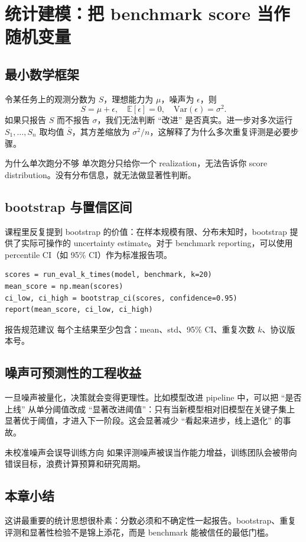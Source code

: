 \section{统计建模：把 benchmark score 当作随机变量}

\subsection{最小数学框架}
令某任务上的观测分数为 $S$，理想能力为 $\mu$，噪声为 $\epsilon$，则
$$
S = \mu + \epsilon,\quad \mathbb{E}[\epsilon]=0,\quad \mathrm{Var}(\epsilon)=\sigma^2.
$$
如果只报告 $S$ 而不报告 $\sigma$，我们无法判断 ``改进'' 是否真实。进一步对多次运行 $S_1,\dots,S_n$ 取均值 $\bar{S}$，其方差缩放为 $\sigma^2/n$，这解释了为什么多次重复评测是必要步骤。

\begin{knowledgebox}{为什么单次跑分不够}
单次跑分只给你一个 realization，无法告诉你 score distribution。没有分布信息，就无法做显著性判断。
\end{knowledgebox}

\subsection{bootstrap 与置信区间}
课程里反复提到 bootstrap 的价值：在样本规模有限、分布未知时，bootstrap 提供了实际可操作的 uncertainty estimate。对于 benchmark reporting，可以使用 percentile CI（如 95\% CI）作为标准报告项。

\begin{lstlisting}[caption={Benchmark 置信区间计算的最小伪代码}]
scores = run_eval_k_times(model, benchmark, k=20)
mean_score = np.mean(scores)
ci_low, ci_high = bootstrap_ci(scores, confidence=0.95)
report(mean_score, ci_low, ci_high)
\end{lstlisting}

\begin{importantbox}{报告规范建议}
每个主结果至少包含：mean、std、95\% CI、重复次数 $k$、协议版本号。
\end{importantbox}

\subsection{噪声可预测性的工程收益}
一旦噪声被量化，决策就会变得更理性。比如模型改进 pipeline 中，可以把 ``是否上线'' 从单分阈值改成 ``显著改进阈值''：只有当新模型相对旧模型在关键子集上显著优于阈值，才进入下一阶段。这会显著减少 ``看起来进步，线上退化'' 的事故。

\begin{warningbox}{未校准噪声会误导训练方向}
如果评测噪声被误当作能力增益，训练团队会被带向错误目标，浪费计算预算和研究周期。
\end{warningbox}

\subsection{本章小结}
这讲最重要的统计思想很朴素：分数必须和不确定性一起报告。bootstrap、重复评测和显著性检验不是锦上添花，而是 benchmark 能被信任的最低门槛。

